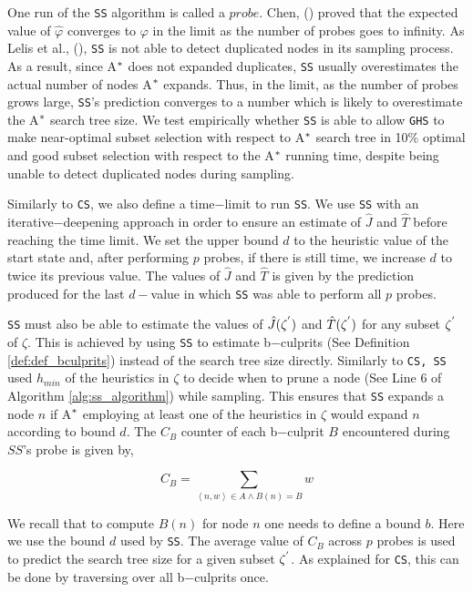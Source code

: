 One run of the \texttt{SS} algorithm is called a $probe$. Chen,  (\citeyear{chen1992heuristic}) proved that the expected value of $\hat{\varphi}$ converges to $\varphi$ in the limit as the number of probes goes to infinity. As Lelis et al., (\citeyear{lelis2014estimating}), \texttt{SS} is not able to detect duplicated nodes in its sampling process. As a result, since A$\sp{*}$ does not expanded duplicates, \texttt{SS} usually overestimates the actual number of nodes A$\sp{*}$ expands. Thus, in the limit, as the number of probes grows large, \texttt{SS}'s prediction converges to a number which  is likely to overestimate the A$\sp{*}$ search tree size. We test empirically whether \texttt{SS} is able to allow \texttt{GHS} to make near-optimal subset selection with respect to A$\sp{*}$ search tree in 10\% optimal and good subset selection with respect to the A$\sp{*}$ running time, despite being unable to detect duplicated nodes during sampling.

Similarly to \texttt{CS}, we also define a time$-$limit to run \texttt{SS}. We use \texttt{SS} with an iterative$-$deepening approach in order to ensure an estimate of $\hat{J}$ and $\hat{T}$ before reaching the time limit. We set the upper bound $d$ to the heuristic value of the start state and, after performing $p$ probes, if there is still time, we increase $d$ to twice its previous value. The values of $\hat{J}$ and $\hat{T}$ is given by the prediction produced for the last $d-$value in which \texttt{SS} was able to perform all $p$ probes.

\texttt{SS} must also be able to estimate the values of $\hat{J}(\zeta\sp{'})$ and $\hat{T}(\zeta\sp{'})$ for any subset $\zeta\sp{'}$ of $\zeta$. This is achieved by using \texttt{SS} to estimate b$-$culprits (See Definition \ref{def:def_bculprits}) instead of the search tree size directly. Similarly to \texttt{CS, SS} used $h_{min}$ of the heuristics in $\zeta$ to decide when to prune a node (See Line 6 of Algorithm \ref{alg:ss_algorithm}) while sampling. This ensures that \texttt{SS} expands a node $n$ if A$\sp{*}$ employing at least one of the heuristics in $\zeta$ would expand $n$ according to bound $d$. The $C_{B}$ counter of each b$-$culprit $B$ encountered during $SS$'s probe is given by,

\begin{equation}
C_{B} = \sum_{\left\langle n,w \right\rangle \in A \wedge B(n) = B}w
\label{eq:eq_CB}
\end{equation}

We recall that to compute $B(n)$ for node $n$ one needs to define a bound $b$. Here we use the bound $d$ used by \texttt{SS}. The average value of $C_{B}$ across $p$ probes is used to predict the search tree size for a given subset $\zeta\sp{'}$. As explained for \texttt{CS}, this can be done by traversing over all b$-$culprits once.

